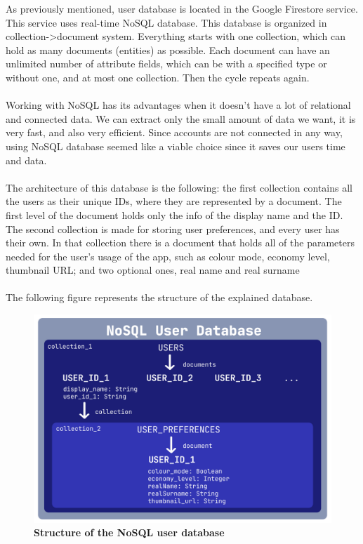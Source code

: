\hspace{\parindent}As previously mentioned, user database is located in the Google Firestore service. This service uses real-time NoSQL database. This database is organized in collection->document system. Everything starts with one collection, which can hold as many documents (entities) as possible. Each document can have an unlimited number of attribute fields, which can be with a specified type or without one, and at most one collection. Then the cycle repeats again.\\ \\
Working with NoSQL has its advantages when it doesn't have a lot of relational and connected data. We can extract only the small amount of data we want, it is very fast, and also very efficient. Since accounts are not connected in any way, using NoSQL database  seemed like a viable choice since it saves our users time and data. \\ \\
The architecture of this database is the following: the first collection contains all the users as their unique IDs, where they are represented by a document. The first level of the document holds only the info of the display name and the ID.  The second collection is made for storing user preferences, and every user has their own. In that collection there is a document that holds all of the parameters needed for the user's usage of the app, such as colour mode, economy level, thumbnail URL; and two optional ones, real name and real surname
\\ \\
The following figure represents the structure of the explained database.\\
\begin{figure}[!htb]
\centering
\includegraphics[width=\textwidth]{../Images/NoSQLStructurePNG.png}
\caption{\label{fig:dbapiuser}\textbf{Structure of the NoSQL user database}}
\end{figure}
\newpage


